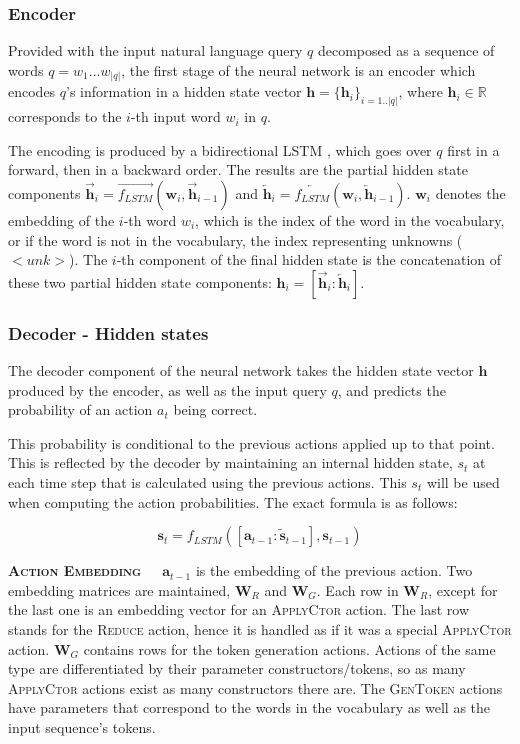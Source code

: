 \subsubsection{Encoder}

Provided with the input natural language query \(q\) decomposed as a sequence
of words \(q = w_{1}...w_{|q|}\), the first stage of the neural network is an
encoder which encodes \(q\)'s information in a hidden state vector \(\mathbf{h} =
\{\mathbf{h}_{i}\}_{i=1..|q|}\), where \(\mathbf{h}_{i} \in \mathbb{R}\)
corresponds to the \(i\)-th input word \(w_{i}\) in \(q\).

The encoding is produced by a bidirectional LSTM \cite{HochreiterSchmidhuber1997, SchusterPaliwal1997}, which goes over \(q\) first in a forward, then in a backward
order. The results are the partial hidden state components
\(\overrightarrow{\mathbf{h}}_{i} = \overrightarrow{f_{LSTM}}(\mathbf{w}_{i}, \overrightarrow{\mathbf{h}}_{i-1})\) and \(\overleftarrow{\mathbf{h}}_{i} =
\overleftarrow{f_{LSTM}}(\mathbf{w}_{i}, \overleftarrow{\mathbf{h}}_{i-1})\).
\(\mathbf{w}_{i}\) denotes the embedding of the \(i\)-th word \(w_{i}\), 
which is the index of the word in the vocabulary, or if the word is not
in the vocabulary, the index representing unknowns (\(<unk>\)).
The \(i\)-th component of the final hidden state is the concatenation of
these two partial hidden state components: \(\mathbf{h}_{i} = 
[\overrightarrow{\mathbf{h}}_{i} : \overleftarrow{\mathbf{h}}_{i}]\).

\subsubsection{Decoder - Hidden states}

The decoder component of the neural network takes the hidden state vector
\(\mathbf{h}\) produced by the encoder, as well as the input query \(q\),
and predicts the probability of an action \(a_{t}\) being correct.

This probability is conditional to the previous actions applied up to that
point. This is reflected by the decoder by maintaining an internal hidden
state, \(s_{t}\) at each time step that is calculated using the previous actions.
This \(s_{t}\) will be used when computing the action probabilities.
The exact formula is as follows:

\[\textbf{s}_{t} = f_{LSTM}([\textbf{a}_{t-1} : \tilde{\textbf{s}}_{t-1}], \textbf{s}_{t-1})\]

\textbf{\textsc{Action Embedding}}\ \ \ \(\textbf{a}_{t-1}\) is the embedding
of the previous action. Two embedding matrices are maintained, \(\textbf{W}_{R}\)
and \(\textbf{W}_{G}\). Each row in \(\textbf{W}_{R}\), except for the last one
is an embedding vector for an \textsc{ApplyCtor} action. The last row stands for
the \textsc{Reduce} action, hence it is handled as if it was a special \textsc{ApplyCtor}
action. \(\textbf{W}_{G}\) contains rows for the token generation actions. Actions of the
same type are differentiated by their parameter constructors/tokens, so as many
\textsc{ApplyCtor} actions exist as many constructors there are. The \textsc{GenToken}
actions have parameters that correspond to the words in the vocabulary as well
as the input sequence's tokens.

